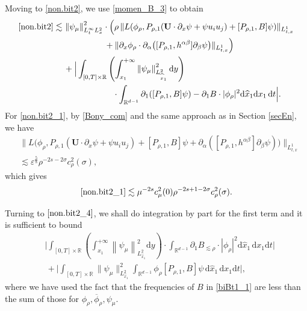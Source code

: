 \documentclass[11pt,letterpaper,reqno]{amsart}
\numberwithin{equation}{section}
\theoremstyle{definition}
\theoremstyle{remark}
\newcommand{\pa}{\partial}
\begin{document}
Moving to \eqref{non.bit2}, we use \eqref{momen_B_3} to obtain
 \begin{align}
   \eqref{non.bit2}  \lesssim &\,     \left\|\psi_\mu\right\|^2_{L^\infty_t L^2_{x}}    \cdot \Big( \rho\,  \|  L( \phi_\rho, P_{\rho,1} (\mathbf{U} \cdot \partial_x \psi+\psi  u_i u_j)+ [P_{\rho,1} , B]\psi )\|_{L^1_{t,x}} \nonumber\\
 & \qquad \qquad      \quad + \|  \pa_x \phi_\rho \cdot \partial_{\alpha} \big([P_{\rho,1}, h^{\alpha\beta} ]   \partial_{ \beta} \psi \big) \|_{L^1_{t,x}}\Big) \label{non.bit2_1}  \\
    & \label{non.bit2_4}\, +\Big| \int_{[0,T]\times \mathbb{R}}  \left( \int^{+\infty}_{x_1}   \left\|\psi_\mu\right\|^2_{L^2_{\widehat{x}_1}}   \mathrm{ d} y\right) \\
  &\qquad \qquad\qquad \cdot  \int_{\mathbb{R}^{d-1}}   \partial_1( [P_{\rho,1} , B]\psi)-\pa_{1}B \cdot |\phi_\rho |^2 \mathrm{d} \widehat{x}_1 \mathrm{ d} x_1 \, \mathrm{ d} t\Big|. \nonumber
 \end{align}
For \eqref{non.bit2_1}, by \eqref{Bony_com} and the same approach as in Section \ref{secEn}, we have 
\begin{equation*} 
   \begin{aligned}
    & \|L \big( \phi_\rho , P_{\rho,1} (\mathbf{U} \cdot \partial_x \psi+ \psi  u_i u_j)+[P_{\rho,1}, B]\psi+\partial_{\alpha} ([P_{\rho,1}, h^{\alpha\beta} ]   \partial_{ \beta} \psi)  \big )   \|_{L^1_{t,x}} \\
    & \lesssim   \varepsilon^{\frac 58} \rho^{-2s-2\sigma} c_\rho^2(\sigma),
\end{aligned} 
\end{equation*}
 which gives  
\begin{align*}
  \eqref{non.bit2_1}  \lesssim   \mu ^{-2s} c_\mu ^2(0)  \rho^{-2s+1-2\sigma} c_\rho^2(\sigma).
\end{align*}


Turning to \( \eqref{non.bit2_4} \), we shall do integration by part for the first term and  it is sufficient to bound 
 \begin{align}
	&\Big|\int_{[0,T]\times \mathbb{R}}  \left( \int^{+\infty}_{x_1}   \left\|\psi_\mu\right\|^2_{L^2_{\widehat{x}_1}}\mathrm{ d} y\right)\cdot \int_{\mathbb{R}^{d-1}} \partial_{1}  B_{\lesssim \rho}   \cdot  | \phi_\rho |^2  \mathrm{d} \widehat{x}_1\, \mathrm{ d} x_1 \mathrm{ d} t\Big|\label{biBt1_1}\\
    &\,+ \Big|  \int_{[0,T]\times \mathbb{R}} \|\psi_{\mu}\|_{L^2_{\hat{x}_1}}^2 \int_{\mathbb{R}^{d-1}}\phi_\rho [P_{\rho,1},B] \psi \,  \mathrm{d}\widehat{x}_1 \,\mathrm{d}x_1 \mathrm{d} t\Big|, \label{biBt1_15}
\end{align}
where we    have used the fact  that 
 the frequencies   of $ B $ in \eqref{biBt1_1}  are less than  the sum of those for $ \phi_\rho , \overline{\phi}_\rho, \psi_\mu  $.
\end{document}
